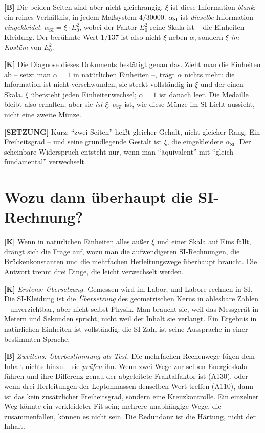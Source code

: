 \textbf{[B]} Die beiden Seiten sind aber nicht gleichrangig. $\xi$ ist diese
Information \emph{blank}: ein reines Verhältnis, in jedem Maßsystem $4/30000$.
$\alpha_\text{SI}$ ist \emph{dieselbe} Information \emph{eingekleidet}:
$\alpha_\text{SI} = \xi\cdot E_0^2$, wobei der Faktor $E_0^2$ reine Skala ist --
die Einheiten-Kleidung. Der berühmte Wert $1/137$ ist also nicht $\xi$ neben
$\alpha$, sondern $\xi$ \emph{im Kostüm} von $E_0^2$.

\textbf{[K]} Die Diagnose dieses Dokuments bestätigt genau das. Zieht man die
Einheiten ab -- setzt man $\alpha = 1$ in natürlichen Einheiten --, trägt
$\alpha$ nichts mehr: die Information ist nicht verschwunden, sie steckt
vollständig in $\xi$ und der einen Skala. $\xi$ übersteht jeden Einheitenwechsel;
$\alpha = 1$ ist danach leer. Die Medaille bleibt also erhalten, aber sie
\emph{ist} $\xi$: $\alpha_\text{SI}$ ist, wie diese Münze im SI-Licht aussieht,
nicht eine zweite Münze.

\textbf{[SETZUNG]} Kurz: \enquote{zwei Seiten} heißt gleicher Gehalt, nicht
gleicher Rang. Ein Freiheitsgrad -- und seine grundlegende Gestalt ist $\xi$, die
eingekleidete $\alpha_\text{SI}$. Der scheinbare Widerspruch entsteht nur, wenn
man \enquote{äquivalent} mit \enquote{gleich fundamental} verwechselt.

\section{Wozu dann überhaupt die SI-Rechnung?}

\textbf{[K]} Wenn in natürlichen Einheiten alles außer $\xi$ und einer Skala auf
Eins fällt, drängt sich die Frage auf, wozu man die aufwendigeren
SI-Rechnungen, die Brückenkonstanten und die mehrfachen Herleitungswege
überhaupt braucht. Die Antwort trennt drei Dinge, die leicht verwechselt werden.

\textbf{[K]} \emph{Erstens: Übersetzung.} Gemessen wird im Labor, und Labore
rechnen in SI. Die SI-Kleidung ist die \emph{Übersetzung} des geometrischen
Kerns in ablesbare Zahlen -- unverzichtbar, aber nicht selbst Physik. Man
braucht sie, weil das Messgerät in Metern und Sekunden spricht, nicht weil der
Inhalt sie verlangt. Ein Ergebnis in natürlichen Einheiten ist vollständig; die
SI-Zahl ist seine Aussprache in einer bestimmten Sprache.

\textbf{[B]} \emph{Zweitens: Überbestimmung als Test.} Die mehrfachen
Rechenwege fügen dem Inhalt nichts hinzu -- sie \emph{prüfen} ihn. Wenn zwei
Wege zur selben Energieskala führen und ihre Differenz genau der abgeleitete
Fraktalfaktor ist (A130), oder wenn drei Herleitungen der Leptonmassen
denselben Wert treffen (A110), dann ist das kein zusätzlicher Freiheitsgrad,
sondern eine Kreuzkontrolle. Ein einzelner Weg könnte ein verkleideter Fit
sein; mehrere unabhängige Wege, die zusammenfallen, können es nicht sein. Die
Redundanz ist die Härtung, nicht der Inhalt.

